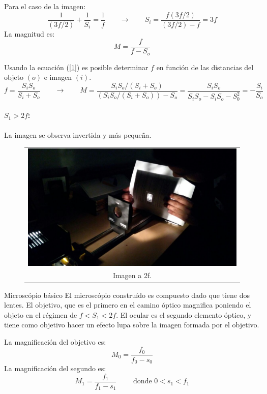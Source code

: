 \documentclass[addpoints,10pt]{exam}
\begin{document}
\begin{questions}
			Para el caso de la imagen:
			\begin{equation}\label{1}
				\dfrac{1}{(3f/2)} + \dfrac{1}{S_i} = \dfrac{1}{f} \qquad \longrightarrow \qquad S_i = \dfrac{f(3f/2)}{(3f/2) - f} = 3f
			\end{equation}
			La magnitud es:
			\begin{equation}
				M = \dfrac{f}{f - S_o}
			\end{equation}
			
			Usando la ecuaci\'on (\ref{1}) es posible determinar $f$ en funci\'on de las distancias del objeto $(o)$ e imagen $(i)$.
			\begin{equation}
				f = \dfrac{S_iS_o}{S_i + S_o} \qquad \longrightarrow \qquad M = \dfrac{S_iS_o/(S_i + S_o)}{(S_iS_o/(S_i + S_o)) - S_o} = \dfrac{S_iS_o}{S_iS_o - S_iS_o - S_0^2} = -\dfrac{S_i}{S_o}
			\end{equation}
		
		\paragraph{$S_1 > 2f$:}
			La imagen se observa invertida y m\'as peque\~na.
			\begin{figure}[h]
				\centering
				\begin{tabular}{c}
					\includegraphics[width = 0.7\linewidth]{normal.jpeg} \\
					Imagen a 2f.
				\end{tabular}
				
			\end{figure}
			
		{\question Microsc\'opio b\'asico}
		El microsc\'opio constru\'ido es compuesto dado que tiene dos lentes. El objetivo, que es el primero en el camino \'optico magnifica poniendo el objeto en el r\'egimen de $f < S_1 < 2f$. El ocular es el segundo elemento \'optico, y tiene como objetivo hacer un efecto lupa sobre la imagen formada por el objetivo.
		
		La magnificaci\'on del objetivo es:
		\begin{equation}
			M_0 = \dfrac{f_0}{f_0 - s_0}
		\end{equation} 
		La magnificaci\'on del segundo es:
		\begin{equation}
			M_1 = \dfrac{f_1}{f_1 - s_1} \qquad \text{ donde $0<s_1<f_1$}
		\end{equation}
		

\end{questions}
\end{document}
